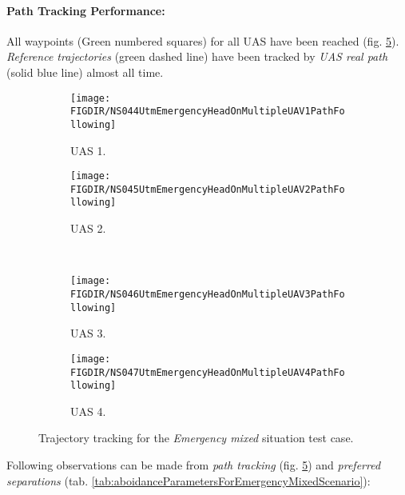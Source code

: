     \noindent\paragraph{Path Tracking Performance:} All waypoints (Green numbered squares) for all UAS have been reached (fig. \ref{fig:testCaseEmergencyMixedTrajectoryTracking}). \emph{Reference trajectories} (green dashed line) have been tracked by \emph{UAS real path} (solid blue line) almost all time. 
    
    \begin{figure}[H]
        \centering
        \begin{subfigure}{0.48\textwidth}
        	\centering
            \texttt{[image: \\FIGDIR/NS044UtmEmergencyHeadOnMultipleUAV1PathFollowing]}
            \caption{UAS 1.}
            \label{fig:emergencyMixedPathTrackingUAS1}
        \end{subfigure}
        \begin{subfigure}{0.48\textwidth}
        	\centering
            \texttt{[image: \\FIGDIR/NS045UtmEmergencyHeadOnMultipleUAV2PathFollowing]} 
            \caption{UAS 2.}
            \label{fig:emergencyMixedPathTrackingUAS2}
        \end{subfigure}
        \\
        \begin{subfigure}{0.48\textwidth}
        	\centering
            \texttt{[image: \\FIGDIR/NS046UtmEmergencyHeadOnMultipleUAV3PathFollowing]} 
            \caption{UAS 3.}
            \label{fig:emergencyMixedPathTrackingUAS4}
        \end{subfigure}
        \begin{subfigure}{0.48\textwidth}
        	\centering
            \texttt{[image: \\FIGDIR/NS047UtmEmergencyHeadOnMultipleUAV4PathFollowing]} 
            \caption{UAS 4.}
            \label{fig:emergencyMixedPathTrackingUAS3}
        \end{subfigure}
        \caption{Trajectory tracking for the \emph{Emergency mixed} situation test case.}
        \label{fig:testCaseEmergencyMixedTrajectoryTracking}
    \end{figure}
    
    Following observations can be made from \emph{path tracking} (fig. \ref{fig:testCaseEmergencyMixedTrajectoryTracking}) and \emph{preferred separations} (tab. \ref{tab:aboidanceParametersForEmergencyMixedScenario}):
    
